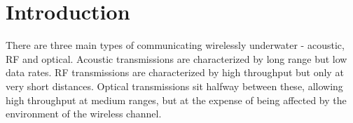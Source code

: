 \section{Introduction}
There are three main types of communicating wirelessly underwater -
acoustic, RF and optical. Acoustic transmissions are characterized by
long range but low data rates. RF transmissions are characterized by
high throughput but only at very short distances. Optical transmissions
sit halfway between these, allowing high throughput at medium ranges,
but at the expense of being affected by the environment of the wireless
channel.
